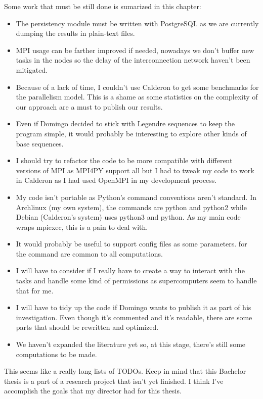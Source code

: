 \documentclass{tfg_domingo}
\begin{document}
  Some work that must be still done is sumarized in this chapter:
  \begin{itemize}
    \item The persistency module must be written with PostgreSQL as we are
    currently dumping the results in plain-text files.
    \item MPI usage can be farther improved if needed, nowadays we don't
    buffer new tasks in the nodes so the delay of the interconnection
    network haven't been mitigated.
    \item Because of a lack of time, I couldn't use Calderon to get some
    benchmarks for the parallelism model. This is a shame as some statistics
    on the complexity of our approach are a must to publish our results.
    \item Even if Domingo decided to stick with Legendre sequences to keep the
    program simple, it would probably be interesting to explore other kinds of
    base sequences.
    \item I should try to refactor the code to be more compatible with
    different versions of MPI as MPI4PY support all but I had to tweak my code
    to work in Calderon as I had used OpenMPI in my development process.
    \item My code isn't portable as Python's command conventions aren't
    standard. In Archlinux (my own system), the commands are python and python2
    while Debian (Calderon's system) uses python3 and python. As my main
    code wraps mpiexec, this is a pain to deal with.
    \item It would probably be useful to support config files as some
    parameters.
    for the command are common to all computations.
    \item I will have to consider if I really have to create a way to interact
    with the tasks and handle some kind of permissions as supercomputers seem
    to handle that for me.
    \item I will have to tidy up the code if Domingo wants to publish it as
    part of his investigation. Even though it's commented and it's readable,
    there are some parts that should be rewritten and optimized.
    \item We haven't expanded the literature yet so, at this stage, there's
    still some computations to be made.
  \end{itemize}

  This seems like a really long lists of TODOs. Keep in mind that this
  Bachelor thesis is a part of a research project that isn't yet finished. I
  think I've accomplish the goals that my director had for this thesis.
\end{document}
